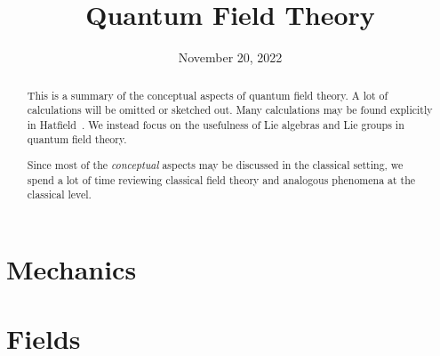 \documentclass{report}
\title{Quantum Field Theory}
\date{November 20, 2022}
\begin{document}
\maketitle

\begin{abstract}
This is a summary of the conceptual aspects of quantum field theory. A
lot of calculations will be omitted or sketched out. Many calculations
may be found explicitly in Hatfield~\cite{Hatfield:1992rz}. We instead
focus on the usefulness of Lie algebras and Lie groups in quantum field
theory.

Since most of the \emph{conceptual} aspects may be discussed in the
classical setting, we spend a lot of time reviewing classical field
theory and analogous phenomena at the classical level.
\end{abstract}

\tableofcontents



\part{Mechanics}




\part{Fields}



\appendix



\printindex
\end{document}
